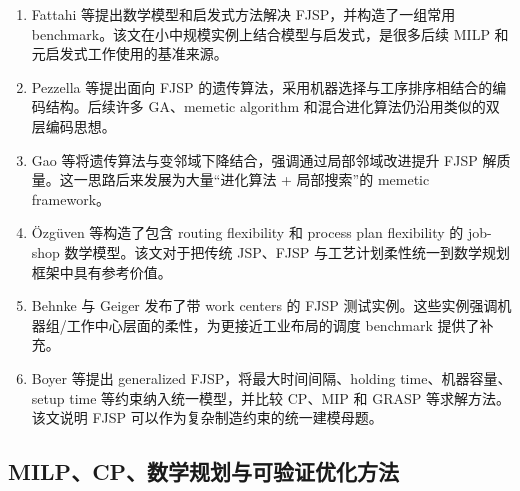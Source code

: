 \documentclass[UTF8,a4paper,11pt]{ctexart}
\begin{document}
\begin{enumerate}[label=\textbf{F\arabic*.},leftmargin=3em]
\item Fattahi 等提出数学模型和启发式方法解决 FJSP，并构造了一组常用 benchmark\cite{Fattahi2007}。该文在小中规模实例上结合模型与启发式，是很多后续 MILP 和元启发式工作使用的基准来源。

\item Pezzella 等提出面向 FJSP 的遗传算法，采用机器选择与工序排序相结合的编码结构\cite{Pezzella2008}。后续许多 GA、memetic algorithm 和混合进化算法仍沿用类似的双层编码思想。

\item Gao 等将遗传算法与变邻域下降结合，强调通过局部邻域改进提升 FJSP 解质量\cite{Gao2008}。这一思路后来发展为大量“进化算法 + 局部搜索”的 memetic framework。

\item \"Ozg\"uven 等构造了包含 routing flexibility 和 process plan flexibility 的 job-shop 数学模型\cite{Ozgüven2010}。该文对于把传统 JSP、FJSP 与工艺计划柔性统一到数学规划框架中具有参考价值。

\item Behnke 与 Geiger 发布了带 work centers 的 FJSP 测试实例\cite{Behnke2012}。这些实例强调机器组/工作中心层面的柔性，为更接近工业布局的调度 benchmark 提供了补充。

\item Boyer 等提出 generalized FJSP，将最大时间间隔、holding time、机器容量、setup time 等约束纳入统一模型，并比较 CP、MIP 和 GRASP 等求解方法\cite{Boyer2021GFJSP}。该文说明 FJSP 可以作为复杂制造约束的统一建模母题。
\end{enumerate}

\subsection{MILP、CP、数学规划与可验证优化方法}
\end{document}
